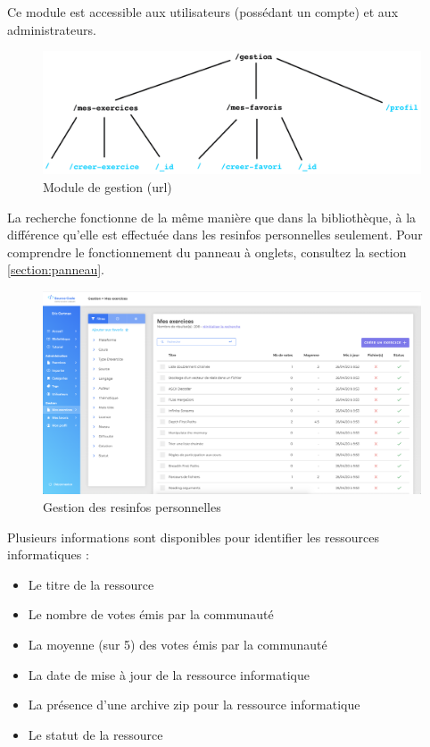 Ce module est accessible aux utilisateurs (possédant un compte) et aux administrateurs.

\begin{figure}[H]
    \includegraphics[width=\textwidth,height=\textheight,keepaspectratio]{images/client/gestion.jpeg}
    \centering
    \caption[SourceCode : module de gestion (url)]{Module de gestion (url)}
\end{figure}


La recherche fonctionne de la même manière que dans la bibliothèque, à la différence qu'elle est effectuée dans les \glspl{resinfo} personnelles seulement. Pour comprendre le fonctionnement du panneau à onglets, consultez la section \ref{section:panneau}.

\begin{figure}[H]
    \includegraphics[width=\textwidth,height=\textheight,keepaspectratio]{images/client/gestion-exercices.png}
    \centering
    \caption[SourceCode : gestion des \glspl{resinfo} personnelles]{Gestion des \glspl{resinfo} personnelles}
\end{figure}

Plusieurs informations sont disponibles pour identifier les ressources informatiques :

\begin{itemize}
    \item Le titre de la ressource
    \item Le nombre de votes émis par la communauté
    \item La moyenne (sur 5) des votes émis par la communauté
    \item La date de mise à jour de la ressource informatique
    \item La présence d'une archive zip pour la ressource informatique
    \item Le statut de la ressource
\end{itemize}


